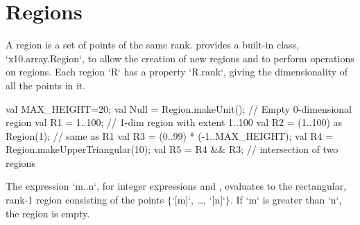 \section{Regions}\label{XtenRegions}

A region is a set of points of the same rank.  {}\Xten{}
provides a built-in class, \xcd`x10.array.Region`, to allow the
creation of new regions and to perform operations on regions. 
Each region \xcd`R` has a property \xcd`R.rank`, giving the dimensionality of
all the points in it.

\begin{xten}
val MAX_HEIGHT=20;
val Null = Region.makeUnit();  // Empty 0-dimensional region
val R1 = 1..100; // 1-dim region with extent 1..100
val R2 = (1..100) as Region(1); // same as R1
val R3 = (0..99) * (-1..MAX_HEIGHT);
val R4 = Region.makeUpperTriangular(10);
val R5 = R4 && R3; // intersection of two regions
\end{xten}

The expression \xcdmath`m..n`, for integer expressions  and ,
evaluates to the rectangular, rank-1 region consisting of the points
$\{$\xcdmath`[m]`, \dots, \xcdmath`[n]`$\}$. If \xcdmath`m` is greater than
\xcdmath`n`, the region  is empty.





